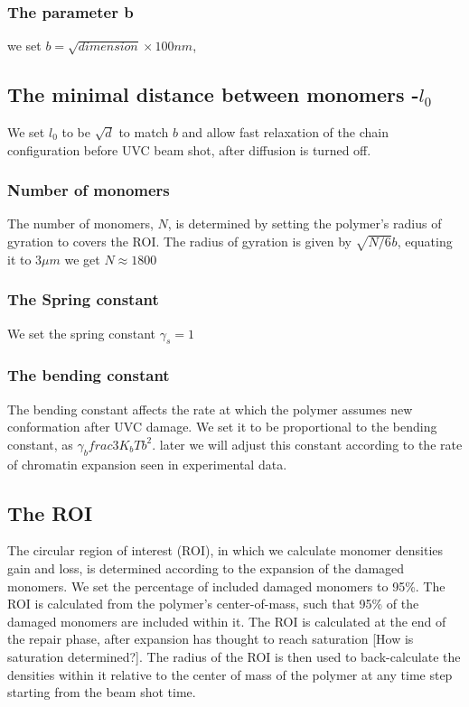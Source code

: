 \documentclass[12pt]{report}
\begin{document}
    \subsubsection{The parameter b} 
      we set $b=\sqrt{dimension} \times 100 nm$, 
    \subsection{The minimal distance between monomers -$l_0$}
     We set $l_0$ to be $\sqrt{d}$ to match $b$ and allow fast relaxation of the chain configuration before UVC beam shot, after diffusion is turned off. 
    \subsubsection{Number of monomers}
      The number of monomers, $N$, is determined by setting the polymer's radius of gyration to covers the ROI. The radius of gyration is given by $\sqrt{N/6}b$, equating it to $3\mu m$ we get $N\approx 1800$                      
     \subsubsection{The Spring constant}
       We set the spring constant $\gamma_s =1$
     \subsubsection{The bending constant}       
       The bending constant affects the rate at which the polymer assumes new conformation after UVC damage.
       We set it to be proportional to the bending constant, as $\gamma_b frac{3K_bT}{b^2}$. later we will adjust this constant according to the rate of chromatin expansion seen in experimental data. 
                   
    \subsection{The ROI}
    The circular region of interest (ROI), in which we calculate monomer densities gain and loss, is determined according to the expansion of the damaged monomers.
    We set the percentage of included damaged monomers to 95\%. The ROI is calculated from the polymer's center-of-mass, such that 95\% of the damaged monomers are included within it. 
    The ROI is calculated at the end of the repair phase, after expansion has thought to reach saturation [How is saturation determined?]. The radius of the ROI is then used to back-calculate the densities within it relative to the center of mass of the polymer at any time step starting from the beam shot time. 
    
\end{document}
